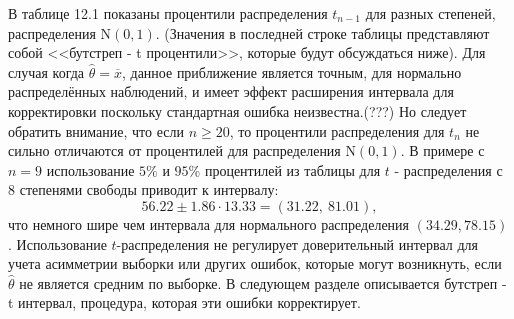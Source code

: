 В таблице 12.1 показаны процентили распределения $t_{n-1}$ для разных степеней, распределения $\mathrm{N} (0, 1)$. (Значения в последней строке таблицы представляют собой <<бутстреп - t процентили>>, которые будут обсуждаться ниже). Для случая когда $ \widehat{\theta} = \overline{x}$, данное приближение является точным, для нормально распределённых наблюдений, и имеет эффект расширения интервала для корректировки поскольку стандартная ошибка неизвестна.(???) Но следует обратить внимание, что если $n \ge 20$, то процентили распределения для $t_{n}$ не сильно отличаются от процентилей для распределения $\mathrm{N}(0, 1)$. В примере с $n = 9$ использование $5\%$ и $95\%$ процентилей из таблицы для $t$ - распределения с 8 степенями свободы приводит к интервалу:
$$56.22 \pm 1.86\cdot 13.33 = (31.22,\ 81.01),$$
что немного шире чем интервала для нормального распределения $(34.29, 78.15)$. Использование $t$-распределения не регулирует доверительный интервал для учета асимметрии выборки или других ошибок, которые могут возникнуть, если $\widehat{\theta}$ не является средним по выборке. В следующем разделе описывается бутстреп - t интервал, процедура, которая эти ошибки корректирует.
